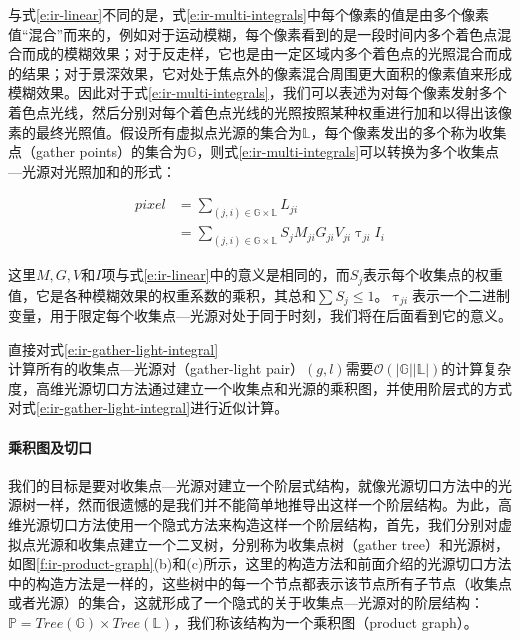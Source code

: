 与式\ref{e:ir-linear}不同的是，式\ref{e:ir-multi-integrals}中每个像素的值是由多个像素值“混合”而来的，例如对于运动模糊，每个像素看到的是一段时间内多个着色点混合而成的模糊效果；对于反走样，它也是由一定区域内多个着色点的光照混合而成的结果；对于景深效果，它对处于焦点外的像素混合周围更大面积的像素值来形成模糊效果。因此对于式\ref{e:ir-multi-integrals}，我们可以表述为对每个像素发射多个着色点光线，然后分别对每个着色点光线的光照按照某种权重进行加和以得出该像素的最终光照值。假设所有虚拟点光源的集合为$\mathds{L}$，每个像素发出的多个称为收集点（gather points）的集合为$\mathds{G}$，则式\ref{e:ir-multi-integrals}可以转换为多个收集点—光源对光照加和的形式：

\begin{equation}\label{e:ir-gather-light-integral}
\begin{aligned}
	pixel&=\sum_{(j,i)\in\mathds{G}\times\mathds{L}}L_{ji}\\
	     &=\sum_{(j,i)\in\mathds{G}\times\mathds{L}}S_jM_{ji}G_{ji}V_{ji}\uptau_{ji}I_i
\end{aligned}
\end{equation}

\noindent 这里$M,G,V$和$I$项与式\ref{e:ir-linear}中的意义是相同的，而$S_j$表示每个收集点的权重值，它是各种模糊效果的权重系数的乘积，其总和$\sum S_j\leq 1$。$\uptau_{ji}$表示一个二进制变量，用于限定每个收集点—光源对处于同于时刻，我们将在后面看到它的意义。

直接对式\ref{e:ir-gather-light-integral}计算所有的收集点—光源对（gather-light pair）$(g,l)$需要$\mathcal{O}(|\mathds{G}||\mathds{L}|)$的计算复杂度，高维光源切口方法通过建立一个收集点和光源的乘积图，并使用阶层式的方式对式\ref{e:ir-gather-light-integral}进行近似计算。




\paragraph{乘积图及切口}
我们的目标是要对收集点—光源对建立一个阶层式结构，就像光源切口方法中的光源树一样，然而很遗憾的是我们并不能简单地推导出这样一个阶层结构。为此，高维光源切口方法使用一个隐式方法来构造这样一个阶层结构，首先，我们分别对虚拟点光源和收集点建立一个二叉树，分别称为收集点树（gather tree）和光源树，如图\ref{f:ir-product-graph}(b)和(c)所示，这里的构造方法和前面介绍的光源切口方法中的构造方法是一样的，这些树中的每一个节点都表示该节点所有子节点（收集点或者光源）的集合，这就形成了一个隐式的关于收集点—光源对的阶层结构：$\mathds{P}=Tree(\mathds{G})\times Tree(\mathds{L})$，我们称该结构为一个乘积图（product graph）。

